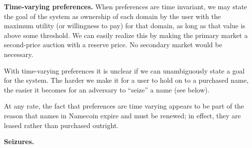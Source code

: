 {\bf Time-varying preferences.} When preferences are time invariant, we may state the goal of the system as ownership of each domain by the user with the maximum utility (or willingness to pay) for that domain, as long as that value is above some threshold. We can easily realize this by making the primary market a second-price auction with a reserve price. No secondary market would be necessary. 


With time-varying preferences it is unclear if we can unambiguously state a goal for the system. The harder we make it for a user to hold on to a purchased name, the easier it becomes for an adversary to ``seize'' a name (see below).

At any rate, the fact that preferences are time varying appears to be part of the reason that names in Namecoin expire and must be renewed; in effect, they are leased rather than purchased outright.

{\bf Seizures. }




